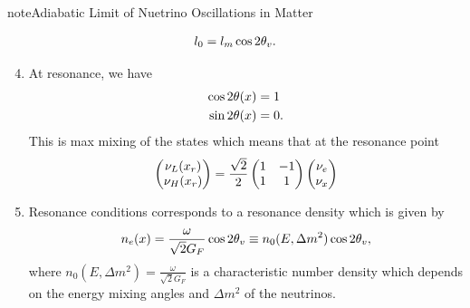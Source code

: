\documentclass[letterpaper,12pt,english]{sphinxmanual}
\begin{document}
\begin{notice}{note}{Adiabatic Limit of Nuetrino Oscillations in Matter}
\begin{enumerate}
\end{enumerate}
\begin{gather}
\begin{split}l_0 = l_m\cos 2\theta_v.\end{split}\notag
\end{gather}\begin{enumerate}
\setcounter{enumi}{3}
\item {} 
At resonance, we have
\begin{gather}
\begin{split}\cos 2\theta(x) &= 1 \\
\sin 2\theta(x) &= 0.\end{split}\notag
\end{gather}
This is max mixing of the states which means that at the resonance point
\begin{gather}
\begin{split}\begin{pmatrix} \nu_L(x_{r}) \\ \nu_H(x_{r}) \end{pmatrix} = \frac{\sqrt{2}}{2}\begin{pmatrix} 1 & -1 \\ 1 & 1 \end{pmatrix} \begin{pmatrix}\nu_e \\ \nu_x \end{pmatrix}\end{split}\notag
\end{gather}
\item {} 
Resonance conditions corresponds to a resonance density which is given by
\begin{gather}
\begin{split}n_e(x) = \frac{\omega}{\sqrt{2}G_F } \cos 2\theta_v \equiv n_0(E,\Delta m^2) \cos 2\theta_v,\end{split}\notag
\end{gather}
where \(n_0(E,\Delta m^2)=\frac{\omega}{\sqrt{2}G_F }\) is a characteristic number density which depends on the energy mixing angles and \(\Delta m^2\) of the neutrinos.


\end{enumerate}
\end{notice}
\end{document}
